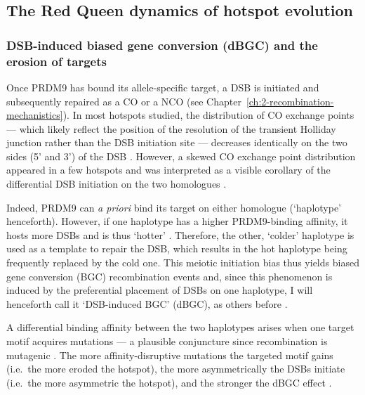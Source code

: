 \subsection{The Red Queen dynamics of hotspot evolution}

\subsubsection{DSB-induced biased gene conversion (dBGC) and the erosion of targets}

Once PRDM9 has bound its allele-specific target, a DSB is initiated and subsequently repaired as a CO or a NCO (see Chapter~\ref{ch:2-recombination-mechanistics}).
In most hotspots studied, the distribution of CO exchange points — which likely reflect the position of the resolution of the transient Holliday junction rather than the DSB initiation site \citep{smith2001homologous} — decreases identically on the two sides (5’ and 3’) of the DSB \citep{arnheim2007mammalian}.
However, a skewed CO exchange point distribution appeared in a few hotspots \citep{jeffreys2002reciprocal,jeffreys2005factors,yauk2003highresolution,neumann2006polymorphism} and was interpreted as a visible corollary of the differential DSB initiation on the two homologues \citep{baudat2007cis}.

Indeed, PRDM9 can \textit{a priori} bind its target on either homologue (‘haplotype’ henceforth). 
However, if one haplotype has a higher PRDM9-binding affinity, it hosts more DSBs and is thus ‘hotter’ \citep{zelazowski2016marks}.
Therefore, the other, ‘colder’ haplotype is used as a template to repair the DSB, which results in the hot haplotype being frequently replaced by the cold one. 
This meiotic initiation bias thus yields biased gene conversion (BGC) recombination events and, since this phenomenon is induced by the preferential placement of DSBs on one haplotype, I will henceforth call it ‘DSB-induced BGC’ (dBGC), as others before \citep{lesecque2014biased, grey2018prdm9}.

A differential binding affinity between the two haplotypes arises when one target motif acquires mutations — a plausible conjuncture since recombination is mutagenic \citep{arbeithuber2015crossovers,rattray2015elevated}.
The more affinity-disruptive mutations the targeted motif gains (i.e.\ the more eroded the hotspot), the more asymmetrically the DSBs initiate (i.e.\ the more asymmetric the hotspot), and the stronger the dBGC effect \citep[reviewed in][]{tiemann-boege2017consequences}.




